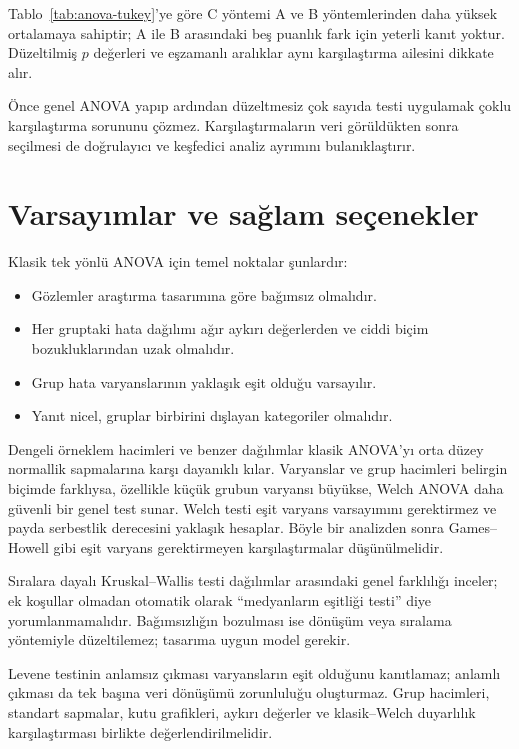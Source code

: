 Tablo~\ref{tab:anova-tukey}'ye göre C yöntemi A ve B yöntemlerinden daha
yüksek ortalamaya sahiptir; A ile B arasındaki beş puanlık fark için yeterli
kanıt yoktur. Düzeltilmiş $p$ değerleri ve eşzamanlı aralıklar aynı karşılaştırma
ailesini dikkate alır.

\begin{mistakebox}
Önce genel ANOVA yapıp ardından düzeltmesiz çok sayıda \tstat testi uygulamak
çoklu karşılaştırma sorununu çözmez. Karşılaştırmaların veri görüldükten sonra
seçilmesi de doğrulayıcı ve keşfedici analiz ayrımını bulanıklaştırır.
\end{mistakebox}

\section{Varsayımlar ve sağlam seçenekler}
\label{sec:anova-assumptions}

Klasik tek yönlü ANOVA için temel noktalar şunlardır:

\begin{itemize}
  \item Gözlemler araştırma tasarımına göre bağımsız olmalıdır.
  \item Her gruptaki hata dağılımı ağır aykırı değerlerden ve ciddi biçim bozukluklarından uzak olmalıdır.
  \item Grup hata varyanslarının yaklaşık eşit olduğu varsayılır.
  \item Yanıt nicel, gruplar birbirini dışlayan kategoriler olmalıdır.
\end{itemize}

Dengeli örneklem hacimleri ve benzer dağılımlar klasik ANOVA'yı orta düzey
normallik sapmalarına karşı dayanıklı kılar. Varyanslar ve grup hacimleri
belirgin biçimde farklıysa, özellikle küçük grubun varyansı büyükse, Welch
ANOVA daha güvenli bir genel test sunar. Welch testi eşit varyans varsayımını
gerektirmez ve payda serbestlik derecesini yaklaşık hesaplar. Böyle bir
analizden sonra Games--Howell gibi eşit varyans gerektirmeyen karşılaştırmalar
düşünülmelidir.

Sıralara dayalı Kruskal--Wallis testi dağılımlar arasındaki genel farklılığı
inceler; ek koşullar olmadan otomatik olarak ``medyanların eşitliği testi''
diye yorumlanmamalıdır. Bağımsızlığın bozulması ise dönüşüm veya sıralama
yöntemiyle düzeltilemez; tasarıma uygun model gerekir.

\begin{assumptionbox}
Levene testinin anlamsız çıkması varyansların eşit olduğunu kanıtlamaz;
anlamlı çıkması da tek başına veri dönüşümü zorunluluğu oluşturmaz. Grup
hacimleri, standart sapmalar, kutu grafikleri, aykırı değerler ve klasik--Welch
duyarlılık karşılaştırması birlikte değerlendirilmelidir.
\end{assumptionbox}

